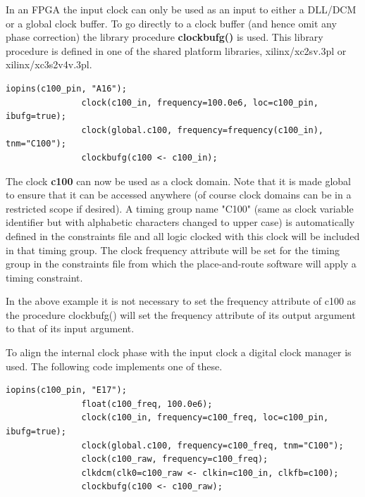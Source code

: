             In an FPGA the input clock can only be used as an input to either a
            DLL/DCM or a global clock buffer. To go directly to a clock buffer (and
            hence omit any phase correction) the library procedure {\bf
            clockbufg()} is used. This library procedure is defined in one of the
            shared platform libraries, xilinx/xc2sv.3pl or xilinx/xc3s2v4v.3pl.
            \begin{lstlisting}[gobble=12, language=threepl]
               iopins(c100_pin, "A16");
               clock(c100_in, frequency=100.0e6, loc=c100_pin, ibufg=true);
               clock(global.c100, frequency=frequency(c100_in), tnm="C100");
               clockbufg(c100 <- c100_in);
            \end{lstlisting}
            The clock {\bf c100} can now be used as a clock domain. Note that it is
            made global to ensure that it can be accessed anywhere (of course clock
            domains can be in a restricted scope if desired). A timing group name
            "C100" (same as clock variable identifier but with alphabetic characters
            changed to upper case) is automatically defined in the constraints file
            and all logic clocked with this clock will be included in that timing
            group. The clock frequency attribute will be set for the timing group in
            the constraints file from which the place-and-route software will apply
            a timing constraint.
            
            In the above example it is not necessary to set the frequency
            attribute of c100 as the procedure clockbufg() will set the
            frequency attribute of its output argument to that of its input
            argument.
            
            To align the internal clock phase with the input clock a digital
            clock manager is used. The following code implements one of these.
            \begin{lstlisting}[gobble=12, language=threepl]
               iopins(c100_pin, "E17");
               float(c100_freq, 100.0e6);
               clock(c100_in, frequency=c100_freq, loc=c100_pin, ibufg=true);
               clock(global.c100, frequency=c100_freq, tnm="C100");
               clock(c100_raw, frequency=c100_freq);
               clkdcm(clk0=c100_raw <- clkin=c100_in, clkfb=c100);
               clockbufg(c100 <- c100_raw);
            \end{lstlisting}
            
